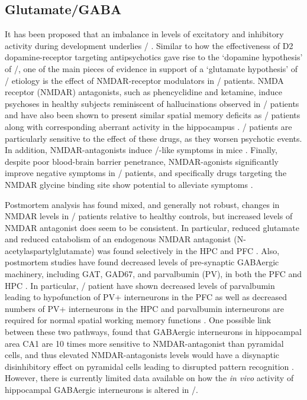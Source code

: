 \subsection{Glutamate/GABA}
\label{sec:intro:scz:glutamate}
It has been proposed that an imbalance in levels of excitatory and inhibitory activity during development underlies \scz/ \citep{Insel2010a, Coyle2006, Yizhar2011}.
Similar to how the effectiveness of D2 dopamine-receptor targeting antipsychotics gave rise to the `dopamine hypothesis' of \scz/, one of the main pieces of evidence in support of a `glutamate hypothesis' of \scz/ etiology is the effect of NMDAR-receptor modulators in \scz/ patients.
NMDA receptor (NMDAR) antagonists, such as phencyclidine and ketamine, induce psychoses in healthy subjects reminiscent of hallucinations observed in \scz/ patients \citep{Javitt1991, Krystal1994} and have also been shown to present similar spatial memory deficits as \scz/ patients along with corresponding aberrant activity in the hippocampus \citep{Morgan2014}.
\Scz/ patients are particularly sensitive to the effect of these drugs, as they worsen psychotic events.
In addition, NMDAR-antagonists induce \scz/-like symptoms in mice \citep{Inta2010}.
Finally, despite poor blood-brain barrier penetrance, NMDAR-agonists significantly improve negative symptoms in \scz/ patients, and specifically drugs targeting the NMDAR glycine binding site show potential to alleviate symptoms \citep{Tsai1998, Coyle2012}.

Postmortem analysis has found mixed, and generally not robust, changes in NMDAR levels in \scz/ patients relative to healthy controls, but increased levels of NMDAR antagonist does seem to be consistent.
In particular, reduced glutamate and reduced catabolism of an endogenous NMDAR antagonist (N-acetylaspartylglutamate) was found selectively in the \ac{HPC} and \ac{PFC} \citep{Tsai1995}. 
Also, postmortem studies have found decreased levels of pre-synaptic GABAergic machinery, including GAT, GAD67, and parvalbumin (PV), in both the \ac{PFC} and HPC \citep{Coyle2006, Zhang2002, Konradi2011}.
In particular, \scz/ patient have shown decreased levels of parvalbumin leading to hypofunction of PV+ interneurons in the \ac{PFC} as well as decreased numbers of PV+ interneurons in the HPC \citep{Zhang2002, Lewis2005} and parvalbumin interneurons are required for normal spatial working memory functions \citep{Korotkova2010, Murray2011}.
One possible link between these two pathways, \citeauthor{Grunze1996} found that GABAergic interneurons in hippocampal area CA1 are 10 times more sensitive to NMDAR-antagonist than pyramidal cells, and thus elevated NMDAR-antagonists levels would have a disynaptic disinhibitory effect on pyramidal cells leading to disrupted pattern recognition \citep{Grunze1996}.
However, there is currently limited data available on how the \emph{in vivo} activity of hippocampal GABAergic interneurons is altered in \scz/.

